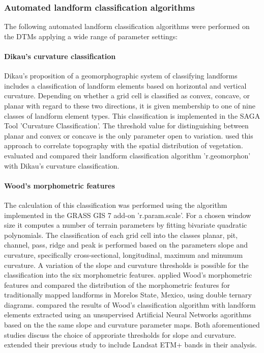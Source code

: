 \documentclass[preprint,12pt,authoryear]{elsarticle}
\begin{document}
\subsubsection{Automated landform classification algorithms}
 The following automated landform classification algorithms were performed on the DTMs applying a wide range of parameter settings:
\paragraph{Dikau's curvature classification \citep{Dikau1988}}
Dikau's proposition of a geomorphographic system of classifying landforms includes a classification of landform elements based on horizontal and vertical curvature. Depending on whether a grid cell is classified as convex, concave, or  planar with regard to these two directions, it is given membership to one of nine classes of landform element types. This classification is implemented in the SAGA Tool 'Curvature Classification'. The threshold value for distinguishing between planar and convex or concave is the only parameter open to variation. \cite{Hoersch2002} used this approach to correlate topography with the spatial distribution of vegetation. \cite{Jasiewicz2013} evaluated and compared their landform classification algorithm 'r.geomorphon' with Dikau's curvature classification.
\paragraph{Wood's morphometric features \citep{Wood1996}}
The calculation of this classification was performed using the algorithm implemented in the GRASS GIS 7  add-on 'r.param.scale'.  For a chosen window size it computes a number of terrain parameters by fitting bivariate quadratic polynomials.  The classification of each grid cell into the classes planar, pit, channel, pass, ridge and peak is performed based on the parameters slope and curvature, specifically cross-sectional, longitudinal, maximum and minumum curvature. A variation of  the slope and curvature thresholds is possible for the classification into the six morphometric features.
\cite{Bolongaro-Crevenna2005} applied Wood's morphometric features and compared the distribution of the morphometric features for traditionally mapped landforms in Morelos State, Mexico, using double ternary diagrams. \cite{Ehsani2008} compared the results of Wood's classification algorithm with landform elements extracted using  an unsupervised Artificial Neural Networks agorithms based on the the same slope and curvature parameter maps. Both aforementioned studies discuss the choice of approriate thresholds for slope and curvature. \cite{Ehsani2009} extended their previous study  to include Landsat ETM+ bands in their analysis.  
\end{document}
